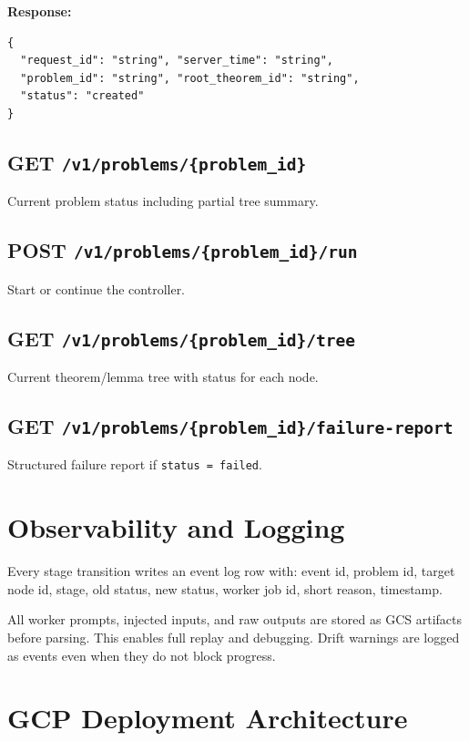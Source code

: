 \documentclass[11pt,a4paper]{article}
\begin{document}
\textbf{Response:}
\begin{lstlisting}
{
  "request_id": "string", "server_time": "string",
  "problem_id": "string", "root_theorem_id": "string",
  "status": "created"
}
\end{lstlisting}

\subsection{GET \texttt{/v1/problems/\{problem\_id\}}}
Current problem status including partial tree summary.

\subsection{POST \texttt{/v1/problems/\{problem\_id\}/run}}
Start or continue the controller.

\subsection{GET \texttt{/v1/problems/\{problem\_id\}/tree}}
Current theorem/lemma tree with status for each node.

\subsection{GET \texttt{/v1/problems/\{problem\_id\}/failure-report}}
Structured failure report if \texttt{status = failed}.

\section{Observability and Logging}

Every stage transition writes an event log row with: event id, problem id, target node id, stage, old status, new status, worker job id, short reason, timestamp.

All worker prompts, injected inputs, and raw outputs are stored as GCS artifacts before parsing. This enables full replay and debugging. Drift warnings are logged as events even when they do not block progress.

\section{GCP Deployment Architecture}
\end{document}
